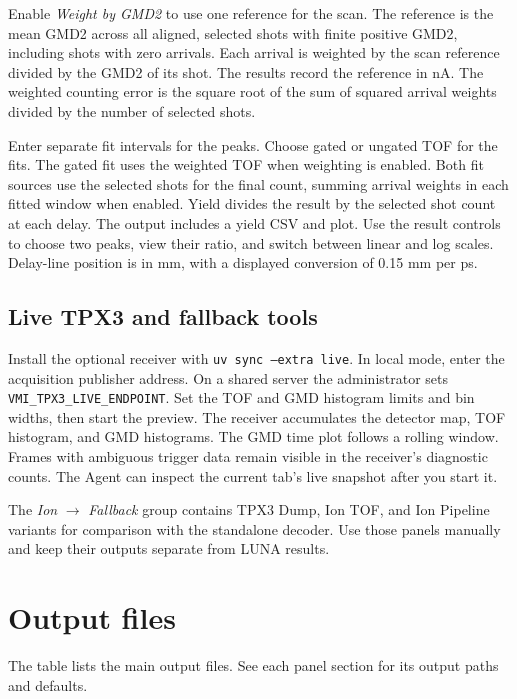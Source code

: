 \documentclass[11pt,a4paper]{article}
\newcommand{\code}[1]{\texttt{#1}}
\begin{document}
Enable \emph{Weight by GMD2} to use one reference for the scan. The reference
is the mean GMD2 across all aligned, selected shots with finite positive
GMD2, including shots with zero arrivals. Each arrival is weighted by the
scan reference divided by the GMD2 of its shot. The results record the
reference in nA. The weighted counting error is the square root of the sum
of squared arrival weights divided by the number of selected shots.

Enter separate fit intervals for the peaks. Choose gated or ungated TOF
for the fits. The gated fit uses the weighted TOF when weighting is enabled.
Both fit sources use the selected shots for the final count, summing arrival
weights in each fitted window when enabled. Yield divides the result by the
selected shot count at each delay.
The output includes a yield CSV and plot. Use the result controls to
choose two peaks, view their ratio, and switch between linear and log
scales. Delay-line position is in mm, with a displayed conversion of
0.15 mm per ps.

\subsection{Live TPX3 and fallback tools}

Install the optional receiver with \code{uv sync --extra live}. In local
mode, enter the acquisition publisher address. On a shared server the
administrator sets \code{VMI\_TPX3\_LIVE\_ENDPOINT}. Set the TOF and
GMD histogram limits and bin widths, then start the preview. The receiver
accumulates the detector map, TOF histogram, and GMD histograms. The GMD
time plot follows a rolling window. Frames with ambiguous trigger data
remain visible in the receiver's diagnostic counts. The Agent can inspect
the current tab's live snapshot after you start it.

The \emph{Ion} $\rightarrow$ \emph{Fallback} group contains TPX3 Dump,
Ion TOF, and Ion Pipeline variants for comparison with the standalone
decoder. Use those panels manually and keep their outputs separate from
LUNA results.

\section{Output files}
\label{sec:outputs}

The table lists the main output files. See each panel section for its
output paths and defaults.
\end{document}
